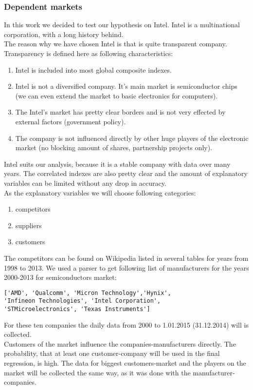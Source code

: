 \documentclass[12pt, a4paper]{article}
\begin{document}
\subsubsection{Dependent markets}
In this work we decided to test our hypothesis on Intel. Intel is a multinational corporation, with a long history behind.\\
The reason why we have chosen Intel is that is quite transparent company. Transparency is defined here as following characteristics:
\begin{enumerate}
	\item Intel is included into most global composite indexes.
	\item Intel is not a diversified company. It's main market is semiconductor chips (we can even extend the market to basic electronics for computers). 
	\item The Intel's market has pretty clear borders and is not very effected by external factors (government policy). 
	\item The company is not influenced directly by other huge players of the electronic market (no blocking amount of shares, partnership projects only).
\end{enumerate}
Intel suits our analysis, because it is a stable company with data over many years. The correlated indexes are also pretty clear and the amount of explanatory variables can be limited without any drop in accuracy.\\
As the explanatory variables we will choose following categories:
\begin{enumerate}
	\item competitors
	\item suppliers
	\item customers
\end{enumerate} 
The competitors can be found on Wikipedia listed in several tables for years from 1998 to 2013. We used a parser to get following list of manufacturers for the years 2000-2013 for semiconductors market:
\begin{verbatim}
['AMD', 'Qualcomm', 'Micron Technology','Hynix',
'Infineon Technologies', 'Intel Corporation', 
'STMicroelectronics', 'Texas Instruments']
\end{verbatim}
For these ten companies the daily data from 2000 to 1.01.2015 (31.12.2014) will is collected.\\
Customers of the market influence the companies-manufacturers directly. The probability, that at least one customer-company will be used in the final regression, is high. The data for biggest customers-market and the players on the market will be collected the same way, as it was done with the manufacturer-companies.
\end{document}

